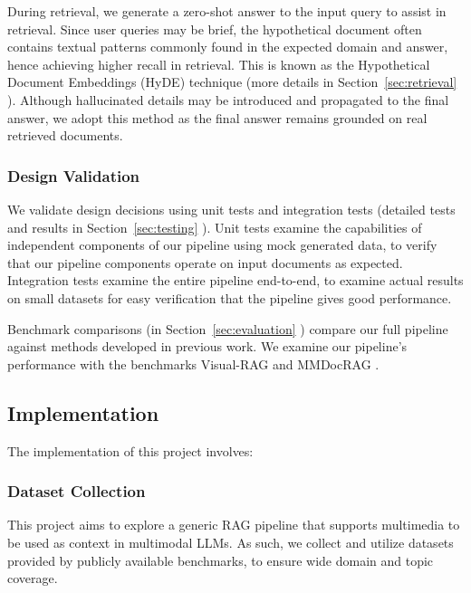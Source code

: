 During retrieval, we generate a zero-shot answer to the input query to assist in retrieval.
Since user queries may be brief, the hypothetical document often contains textual patterns commonly found in the expected domain and answer,
hence achieving higher recall in retrieval.
This is known as the Hypothetical Document Embeddings (HyDE) technique \cite{gao-etal-2023-precise} (more details in Section~\ref{sec:retrieval} ).
Although hallucinated details may be introduced and propagated to the final answer,
we adopt this method as the final answer remains grounded on real retrieved documents.

\subsubsection{Design Validation}

We validate design decisions using unit tests and integration tests (detailed tests and results in Section~\ref{sec:testing} ).
Unit tests examine the capabilities of independent components of our pipeline using mock generated data,
to verify that our pipeline components operate on input documents as expected.
Integration tests examine the entire pipeline end-to-end, to examine actual results on small datasets for easy verification that
the pipeline gives good performance.

Benchmark comparisons (in Section~\ref{sec:evaluation} ) compare our full pipeline against methods developed in previous work.
We examine our pipeline's performance with the benchmarks Visual-RAG \cite{wu2025visualragbenchmarkingtexttoimageretrieval}
and MMDocRAG \cite{dong2025benchmarking}.


\subsection{Implementation}

The implementation of this project involves: 

\subsubsection{Dataset Collection}

This project aims to explore a generic RAG pipeline that supports multimedia to be used as context in multimodal LLMs.
As such, we collect and utilize datasets provided by publicly available benchmarks, to ensure wide domain and topic coverage.

